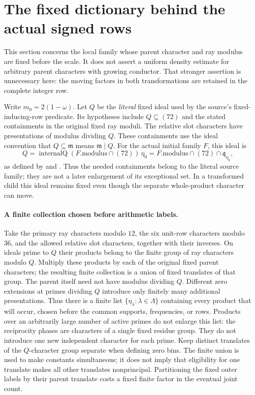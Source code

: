 \section{The fixed dictionary behind the actual signed rows}
\label{sec:fixed-dictionary-bridge}

This section concerns the local family whose parent character and ray
modulus are fixed before the scale. It does not assert a uniform density
estimate for arbitrary parent characters with growing conductor. That
stronger assertion is unnecessary here: the moving factors in both
transformations are retained in the complete integer row.

Write $m_0=2(1-\omega)$. Let $Q$ be the \emph{literal} fixed ideal used
by the source's fixed-inducing-row predicate. Its hypotheses include
$Q\subseteq(72)$ and the stated containments in the original fixed ray
moduli. The relative slot characters have presentations of modulus
dividing $Q$. These containments use the ideal convention that
$Q\subseteq\mathfrak m$ means $\mathfrak m\mid Q$.
For the actual initial family $F$, this ideal is
\[
 Q=\operatorname{internalQ}
       (F.\mathrm{modulus}\cap(72))\,\eta_0
   =F.\mathrm{modulus}\cap(72)\cap\mathfrak q_{\eta_0},
\]
as defined by 
and . Thus the needed containments belong to
the literal source family; they are not a later enlargement of its
exceptional set. In a transformed child this ideal remains fixed even
though the separate whole-product character can move.

\paragraph{A finite collection chosen before arithmetic labels.}
Take the primary ray characters modulo $12$, the six unit-row characters
modulo $36$, and the allowed relative slot characters, together with their
inverses. On ideals prime to $Q$ their products belong to the finite group
of ray characters modulo $Q$. Multiply these products by each of the
original fixed parent characters; the resulting finite collection is a
union of fixed translates of that group. The parent itself need not have
modulus dividing $Q$. Different zero extensions at primes dividing $Q$
introduce only finitely many additional presentations. Thus there is a finite list
$\{\eta_\lambda:\lambda\in\Lambda\}$ containing every product that will
occur, chosen before the common supports, frequencies, or rows. Products
over an arbitrarily large number of active primes do not enlarge this
list: the reciprocity phases are characters of a single fixed residue
group. They do not introduce one new independent character for each prime.
Keep distinct translates of the $Q$-character group separate when defining
zero bins. The finite union is used to make constants simultaneous; it
does not imply that eligibility for one translate makes all other
translates nonprincipal. Partitioning the fixed outer labels by their
parent translate costs a fixed finite factor in the eventual joint count.

